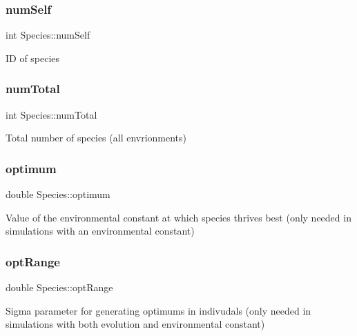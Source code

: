 \subsubsection{\texorpdfstring{num\+Self}{numSelf}}
{\footnotesize\ttfamily int Species\+::num\+Self\hspace{0.3cm}{\ttfamily [protected]}}

ID of species \hypertarget{classSpecies_af13ccb1fc01cff22d7a47201c1002fbc}{}\label{classSpecies_af13ccb1fc01cff22d7a47201c1002fbc} 
\subsubsection{\texorpdfstring{num\+Total}{numTotal}}
{\footnotesize\ttfamily int Species\+::num\+Total\hspace{0.3cm}{\ttfamily [protected]}}

Total number of species (all envrionments) \hypertarget{classSpecies_a234d375e63c9be61d756b7e70d7d9397}{}\label{classSpecies_a234d375e63c9be61d756b7e70d7d9397} 
\subsubsection{\texorpdfstring{optimum}{optimum}}
{\footnotesize\ttfamily double Species\+::optimum\hspace{0.3cm}{\ttfamily [protected]}}

Value of the environmental constant at which species thrives best (only needed in simulations with an environmental constant) \hypertarget{classSpecies_ab7103281892ef74944f3f10df5ecbe69}{}\label{classSpecies_ab7103281892ef74944f3f10df5ecbe69} 
\subsubsection{\texorpdfstring{opt\+Range}{optRange}}
{\footnotesize\ttfamily double Species\+::opt\+Range\hspace{0.3cm}{\ttfamily [protected]}}

Sigma parameter for generating optimums in indivudals (only needed in simulations with both evolution and environmental constant) \hypertarget{classSpecies_af95c9259381c434919dd4e9041a65bc7}{}\label{classSpecies_af95c9259381c434919dd4e9041a65bc7} 

